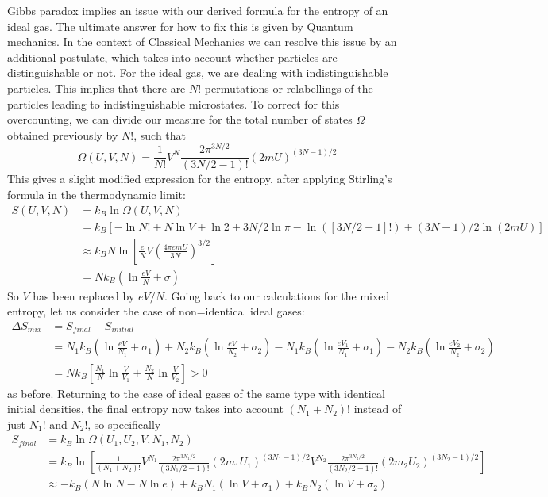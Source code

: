\documentclass[12pt, a4paper, oneside, openright, titlepage]{book}
\begin{document}
Gibbs paradox implies an issue with our derived formula for the entropy of an ideal gas. The ultimate answer for how to fix this is given by Quantum mechanics. In the context of Classical Mechanics we can resolve this issue by an additional postulate, which takes into account whether particles are distinguishable or not. For the ideal gas, we are dealing with indistinguishable particles. This implies that there are $N!$ permutations or relabellings of the particles leading to indistinguishable microstates. To correct for this overcounting, we can divide our measure for the total number of states $\Omega$ obtained previously by $N!$, such that \begin{equation*}
    \Omega(U,V,N) = \frac{1}{N!}V^N\frac{2\pi^{3N/2}}{(3N/2-1)!}(2mU)^{(3N-1)/2}
\end{equation*}
This gives a slight modified expression for the entropy, after applying Stirling's formula in the thermodynamic limit: \begin{align*}
    S(U,V,N) &= k_B\ln\Omega(U,V,N) \\
    &= k_B\left[-\ln N! + N\ln V + \ln 2 + 3N/2\ln \pi - \ln([3N/2-1]!) + (3N-1)/2\ln (2mU)\right] \\
    &\approx k_BN\ln\left[\frac{e}{N}V\left(\frac{4\pi emU}{3N}\right)^{3/2}\right] \\
    &= Nk_B\left(\ln\frac{eV}{N} + \sigma\right)
\end{align*}
So $V$ has been replaced by $eV/N$. Going back to our calculations for the mixed entropy, let us consider the case of non=identical ideal gases: \begin{align*}
    \Delta S_{mix} &= S_{final} - S_{initial} \\
    &= N_1k_B\left(\ln\frac{eV}{N_1} + \sigma_1\right) + N_2k_B\left(\ln\frac{eV}{N_2} + \sigma_2\right) - N_1k_B\left(\ln\frac{eV_1}{N_1} + \sigma_1\right) - N_2k_B\left(\ln\frac{eV_2}{N_2} + \sigma_2\right) \\
    &= Nk_B\left[\frac{N_1}{N}\ln\frac{V}{V_1}+\frac{N_2}{N}\ln\frac{V}{V_2}\right] > 0
\end{align*}
as before. Returning to the case of ideal gases of the same type with identical initial densities, the final entropy now takes into account $(N_1+N_2)!$ instead of just $N_1!$ and $N_2!$, so specifically \begin{align*}
    S_{final} &= k_B\ln \Omega(U_1,U_2,V,N_1,N_2) \\
    &= k_B\ln\left[\frac{1}{(N_1+N_2)!}V^{N_1}\frac{2\pi^{3N_1/2}}{(3N_1/2-1)!}(2m_1U_1)^{(3N_1-1)/2}V^{N_2}\frac{2\pi^{3N_2/2}}{(3N_2/2-1)!}(2m_2U_2)^{(3N_2-1)/2}\right] \\
    &\approx -k_B(N\ln N - N\ln e) + k_BN_1(\ln V + \sigma_1) + k_BN_2(\ln V+\sigma_2) 
\end{align*}
\end{document}
